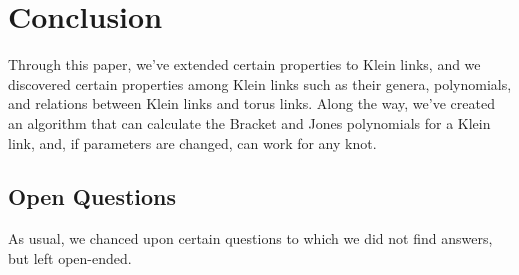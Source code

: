 \documentclass[12pt]{article}
\begin{document}
\section{Conclusion}

Through this paper, we've extended certain properties to Klein links, and we discovered certain properties among Klein links such as their genera, polynomials, and relations between Klein links and torus links. Along the way, we've created an algorithm that can calculate the Bracket and Jones polynomials for a Klein link, and, if parameters are changed, can work for any knot. 

\subsection{Open Questions}

As usual, we chanced upon certain questions to which we did not find answers, but left open-ended. 
\end{document}
